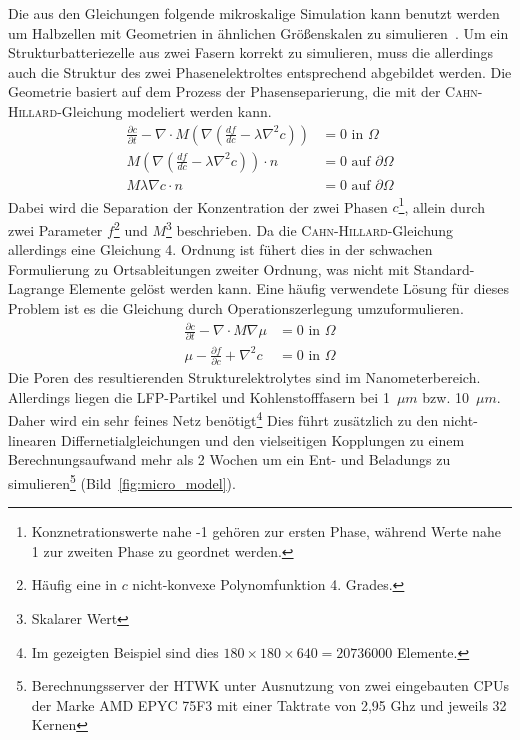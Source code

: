 Die aus den Gleichungen folgende mikroskalige Simulation kann benutzt werden um Halbzellen mit Geometrien in ähnlichen Größenskalen zu simulieren~\cite{Plett2015}. Um ein Strukturbatteriezelle aus zwei Fasern korrekt zu simulieren, muss die allerdings auch die Struktur des zwei Phasenelektroltes entsprechend abgebildet werden\cite{Tu2020}. Die Geometrie basiert auf dem Prozess der Phasenseparierung, die mit der \textsc{Cahn-Hillard}-Gleichung modeliert werden kann\cite{Carolan2015,Grant1993}. 
\begin{align}
    \frac{\partial c}{\partial t} - \nabla \cdot M \left( \nabla \left( \frac{df}{dc} - \lambda \nabla^2 c\right) \right) &= 0 \text{ in }\Omega\\
    M\left( \nabla \left( \frac{df}{dc} - \lambda \nabla^2 c \right)\right) \cdot n &= 0 \text{ auf }\partial\Omega\\
    M \lambda \nabla c \cdot n &= 0 \text{ auf }\partial\Omega
\end{align}
Dabei wird die Separation der Konzentration der zwei Phasen $c$\footnote{Konznetrationswerte nahe -1 gehören zur ersten Phase, während Werte nahe 1 zur zweiten Phase zu geordnet werden.}, allein durch zwei Parameter $f$\footnote{Häufig eine in $c$ nicht-konvexe Polynomfunktion 4. Grades.} und $M$\footnote{Skalarer Wert} beschrieben. Da die \textsc{Cahn-Hillard}-Gleichung allerdings eine Gleichung 4. Ordnung ist fühert dies in der schwachen Formulierung zu Ortsableitungen zweiter Ordnung, was nicht mit Standard-Lagrange Elemente gelöst werden kann. Eine häufig verwendete Lösung für dieses Problem ist es die Gleichung durch Operationszerlegung umzuformulieren.
\begin{align}
    \frac{\partial c}{\partial t} - \nabla \cdot M \nabla \mu &= 0 \text{ in }\Omega\\
    \mu - \frac{\partial f}{\partial c} + \nabla^2 c &= 0 \text{ in }\Omega
\end{align}
Die Poren des resultierenden Strukturelektrolytes sind im Nanometerbereich. Allerdings liegen die LFP-Partikel und Kohlenstofffasern bei 1~$\mu m$ bzw. 10~$\mu m$. Daher wird ein sehr feines Netz benötigt\footnote{Im gezeigten Beispiel sind dies $180 \times 180 \times 640 = 20736000$ Elemente.}
Dies führt zusätzlich zu den nicht-linearen Differnetialgleichungen und den vielseitigen Kopplungen zu einem Berechnungsaufwand mehr als 2 Wochen um ein Ent- und Beladungs zu simulieren\footnote{Berechnungsserver der HTWK unter Ausnutzung von zwei eingebauten CPUs der Marke AMD EPYC 75F3 mit einer Taktrate von 2,95 Ghz und jeweils 32 Kernen} (Bild~\ref{fig:micro_model}). 




